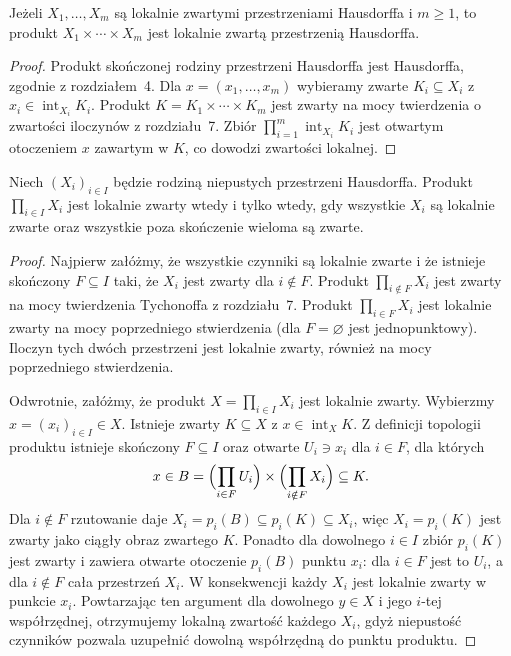 \begin{stwierdzenie}
\label{prop:topog-lokalna-iloczyny}
Jeżeli $X_1,\ldots,X_m$ są lokalnie zwartymi
przestrzeniami Hausdorffa i $m\ge1$, to
produkt $X_1\times\cdots\times X_m$ jest
lokalnie zwartą przestrzenią Hausdorffa.
\end{stwierdzenie}
\begin{proof}
Produkt skończonej rodziny przestrzeni Hausdorffa
jest Hausdorffa, zgodnie z rozdziałem~4.
Dla $x=(x_1,\ldots,x_m)$ wybieramy
zwarte $K_i\subseteq X_i$ z
$x_i\in\operatorname{int}_{X_i}K_i$.
Produkt $K=K_1\times\cdots\times K_m$
jest zwarty na mocy twierdzenia o zwartości
iloczynów z rozdziału~7.
Zbiór
$\prod_{i=1}^m\operatorname{int}_{X_i}K_i$
jest otwartym otoczeniem $x$ zawartym w $K$,
co dowodzi zwartości lokalnej.
\end{proof}

\begin{twierdzenie}
\label{thm:topog-lokalna-dowolny-iloczyn}
Niech $(X_i)_{i\in I}$ będzie rodziną
niepustych przestrzeni Hausdorffa.
Produkt $\prod_{i\in I}X_i$ jest lokalnie
zwarty wtedy i tylko wtedy, gdy wszystkie
$X_i$ są lokalnie zwarte oraz wszystkie
poza skończenie wieloma są zwarte.
\end{twierdzenie}
\begin{proof}
Najpierw załóżmy, że wszystkie czynniki są
lokalnie zwarte i że istnieje skończony
$F\subseteq I$ taki, że $X_i$ jest
zwarty dla $i\notin F$.
Produkt $\prod_{i\notin F}X_i$ jest zwarty
na mocy twierdzenia Tychonoffa z rozdziału~7.
Produkt $\prod_{i\in F}X_i$ jest lokalnie
zwarty na mocy poprzedniego stwierdzenia
(dla $F=\varnothing$ jest jednopunktowy).
Iloczyn tych dwóch przestrzeni jest
lokalnie zwarty, również na mocy
poprzedniego stwierdzenia.

Odwrotnie, załóżmy, że produkt
$X=\prod_{i\in I}X_i$ jest lokalnie zwarty.
Wybierzmy $x=(x_i)_{i\in I}\in X$.
Istnieje zwarty $K\subseteq X$ z
$x\in\operatorname{int}_XK$.
Z definicji topologii produktu
istnieje skończony $F\subseteq I$
oraz otwarte $U_i\ni x_i$ dla $i\in F$,
dla których
\[
x\in B=\Bigl(\prod_{i\in F}U_i\Bigr)
\times\Bigl(\prod_{i\notin F}X_i\Bigr)
\subseteq K.
\]
Dla $i\notin F$ rzutowanie daje
$X_i=p_i(B)\subseteq p_i(K)\subseteq X_i$,
więc $X_i=p_i(K)$ jest zwarty jako
ciągły obraz zwartego $K$.
Ponadto dla dowolnego $i\in I$
zbiór $p_i(K)$ jest zwarty i zawiera
otwarte otoczenie $p_i(B)$ punktu $x_i$:
dla $i\in F$ jest to $U_i$,
a dla $i\notin F$ cała przestrzeń $X_i$.
W konsekwencji każdy $X_i$ jest lokalnie
zwarty w punkcie $x_i$.
Powtarzając ten argument dla dowolnego
$y\in X$ i jego $i$-tej współrzędnej,
otrzymujemy lokalną zwartość każdego $X_i$,
gdyż niepustość czynników pozwala
uzupełnić dowolną współrzędną do
punktu produktu.
\end{proof}

